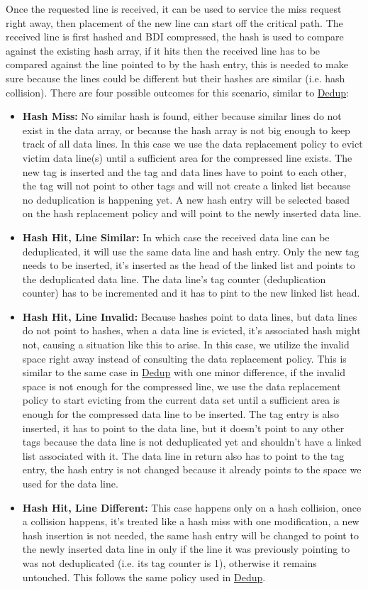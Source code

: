 Once the requested line is received, it can be used to service the miss request right away, then placement of the new line can start off the critical path. The received line is first hashed and BDI compressed, the hash is used to compare against the existing hash array, if it hits then the received line has to be compared against the line pointed to by the hash entry, this is needed to make sure because the lines could be different but their hashes are similar (i.e. hash collision). There are four possible outcomes for this scenario, similar to \hyperref[sssec:DedupOperations]{Dedup}:
\begin{itemize}
    \item \textbf{Hash Miss:} No similar hash is found, either because similar lines do not exist in the data array, or because the hash array is not big enough to keep track of all data lines. In this case we use the data replacement policy to evict victim data line(s) until a sufficient area for the compressed line exists. The new tag is inserted and the tag and data lines have to point to each other, the tag will not point to other tags and will not create a linked list because no deduplication is happening yet. A new hash entry will be selected based on the hash replacement policy and will point to the newly inserted data line.
    \item \textbf{Hash Hit, Line Similar:} In which case the received data line can be deduplicated, it will use the same data line and hash entry. Only the new tag needs to be inserted, it's inserted as the head of the linked list and points to the deduplicated data line. The data line's tag counter (deduplication counter) has to be incremented and it has to pint to the new linked list head.
    \item \textbf{Hash Hit, Line Invalid:} Because hashes point to data lines, but data lines do not point to hashes, when a data line is evicted, it's associated hash might not, causing a situation like this to arise. In this case, we utilize the invalid space right away instead of consulting the data replacement policy. This is similar to the same case in \hyperref[sssec:DedupOperations]{Dedup} with one minor difference, if the invalid space is not enough for the compressed line, we use the data replacement policy to start evicting from the current data set until a sufficient area is enough for the compressed data line to be inserted. The tag entry is also inserted, it has to point to the data line, but it doesn't point to any other tags because the data line is not deduplicated yet and shouldn't have a linked list associated with it. The data line in return also has to point to the tag entry, the hash entry is not changed because it already points to the space we used for the data line.
    \item \textbf{Hash Hit, Line Different:} This case happens only on a hash collision, once a collision happens, it's treated like a hash miss with one modification, a new hash insertion is not needed, the same hash entry will be changed to point to the newly inserted data line in only if the line it was previously pointing to was not deduplicated (i.e. its tag counter is 1), otherwise it remains untouched. This follows the same policy used in \hyperref[sssec:DedupOperations]{Dedup}.
\end{itemize}
